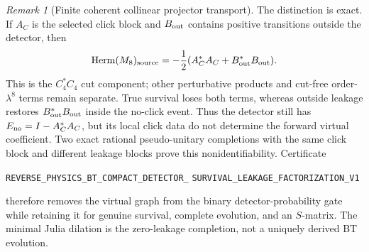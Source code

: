 \documentclass[11pt]{article}
\theoremstyle{definition}
\theoremstyle{remark}
\newtheorem{remark}[theorem]{Remark}
\begin{document}
\begin{remark}[Finite coherent collinear projector transport]
The distinction is exact.  If $A_C$ is the selected click block and
$B_{\rm out}$ contains positive transitions outside the detector, then
\[
 \operatorname{Herm}(M_8)_{\rm source}
 =-\frac12(A_C^*A_C+B_{\rm out}^*B_{\rm out}).
\]
This is the $C_4^*C_4$ cut component; other perturbative products and cut-free
order-$\lambda^8$ terms remain separate.
True survival loses both terms, whereas outside leakage restores
$B_{\rm out}^*B_{\rm out}$ inside the no-click event.  Thus the detector still
has $E_{\rm no}=I-A_C^*A_C$, but its local click data do not determine the
forward virtual coefficient.  Two exact rational pseudo-unitary completions
with the same click block and different leakage blocks prove this
nonidentifiability.  Certificate
\par\noindent
\texttt{REVERSE\_PHYSICS\_BT\_COMPACT\_DETECTOR\_}
\allowbreak\texttt{SURVIVAL\_LEAKAGE\_FACTORIZATION\_V1}
\par\noindent
therefore removes the virtual graph from the binary detector-probability gate
while retaining it for genuine survival, complete evolution, and an
$S$-matrix.  The minimal Julia dilation is the zero-leakage completion, not a
uniquely derived BT evolution.


\end{remark}
\end{document}
